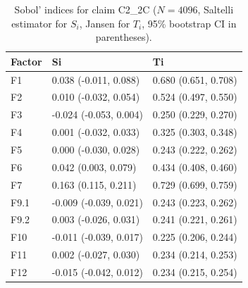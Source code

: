\begin{table}[ht]
\centering
\caption{Sobol' indices for claim C2_2C ($N=4096$, Saltelli estimator for $S_i$, Jansen for $T_i$, 95\% bootstrap CI in parentheses).} 
\label{tab:sobol_C2_2C}
\begin{tabular}{lll}
  \hline
Factor & Si & Ti \\ 
  \hline
F1 & 0.038 (-0.011, 0.088) & 0.680 (0.651, 0.708) \\ 
  F2 & 0.010 (-0.032, 0.054) & 0.524 (0.497, 0.550) \\ 
  F3 & -0.024 (-0.053, 0.004) & 0.250 (0.229, 0.270) \\ 
  F4 & 0.001 (-0.032, 0.033) & 0.325 (0.303, 0.348) \\ 
  F5 & 0.000 (-0.030, 0.028) & 0.243 (0.222, 0.262) \\ 
  F6 & 0.042 (0.003, 0.079) & 0.434 (0.408, 0.460) \\ 
  F7 & 0.163 (0.115, 0.211) & 0.729 (0.699, 0.759) \\ 
  F9.1 & -0.009 (-0.039, 0.021) & 0.243 (0.223, 0.262) \\ 
  F9.2 & 0.003 (-0.026, 0.031) & 0.241 (0.221, 0.261) \\ 
  F10 & -0.011 (-0.039, 0.017) & 0.225 (0.206, 0.244) \\ 
  F11 & 0.002 (-0.027, 0.030) & 0.234 (0.214, 0.253) \\ 
  F12 & -0.015 (-0.042, 0.012) & 0.234 (0.215, 0.254) \\ 
   \hline
\end{tabular}
\end{table}
